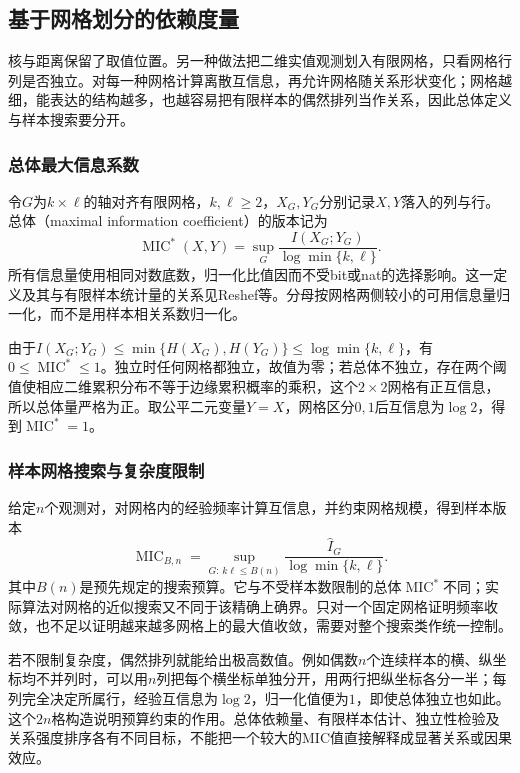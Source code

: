 \subsection{基于网格划分的依赖度量}
\label{sec:information-grid-dependence}

核与距离保留了取值位置。另一种做法把二维实值观测划入有限网格，只看网格行列是否独立。对每一种网格计算离散互信息，再允许网格随关系形状变化；网格越细，能表达的结构越多，也越容易把有限样本的偶然排列当作关系，因此总体定义与样本搜索要分开。

\subsubsection{总体最大信息系数}
令\(G\)为\(k\times\ell\)的轴对齐有限网格，\(k,\ell\geq2\)，\(X_G,Y_G\)分别记录\(X,Y\)落入的列与行。总体（maximal information coefficient）的版本记为
\begin{equation}
 \operatorname{MIC}^{\ast}(X,Y)
 =\sup_G\frac{I(X_G;Y_G)}{\log\min\{k,\ell\}}.
 \label{eq:information-population-mic}
\end{equation}
所有信息量使用相同对数底数，归一化比值因而不受bit或nat的选择影响。这一定义及其与有限样本统计量的关系见Reshef等。分母按网格两侧较小的可用信息量归一化，而不是用样本相关系数归一化。

由于\(I(X_G;Y_G)\leq\min\{H(X_G),H(Y_G)\}\leq\log\min\{k,\ell\}\)，有\(0\leq\operatorname{MIC}^{\ast}\leq1\)。独立时任何网格都独立，故值为零；若总体不独立，存在两个阈值使相应二维累积分布不等于边缘累积概率的乘积，这个\(2\times2\)网格有正互信息，所以总体量严格为正。取公平二元变量\(Y=X\)，网格区分\(0,1\)后互信息为\(\log2\)，得到\(\operatorname{MIC}^{\ast}=1\)。

\subsubsection{样本网格搜索与复杂度限制}
给定\(n\)个观测对，对网格内的经验频率计算互信息，并约束网格规模，得到样本版本
\[
 \operatorname{MIC}_{B,n}
 =\sup_{G:\,k\ell\leq B(n)}
 \frac{\widehat I_G}{\log\min\{k,\ell\}}.
\]
其中\(B(n)\)是预先规定的搜索预算。它与不受样本数限制的总体\(\operatorname{MIC}^{\ast}\)不同；实际算法对网格的近似搜索又不同于该精确上确界。只对一个固定网格证明频率收敛，也不足以证明越来越多网格上的最大值收敛，需要对整个搜索类作统一控制。

若不限制复杂度，偶然排列就能给出极高数值。例如偶数\(n\)个连续样本的横、纵坐标均不并列时，可以用\(n\)列把每个横坐标单独分开，用两行把纵坐标各分一半；每列完全决定所属行，经验互信息为\(\log2\)，归一化值便为\(1\)，即使总体独立也如此。这个\(2n\)格构造说明预算约束的作用。总体依赖量、有限样本估计、独立性检验及关系强度排序各有不同目标，不能把一个较大的MIC值直接解释成显著关系或因果效应。

